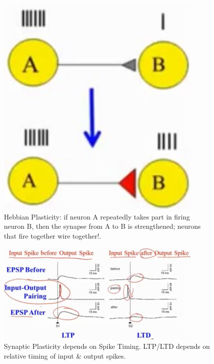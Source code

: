 \documentclass[]{article}
\begin{document}
\begin{figure}[H]
	\caption[Hebbian Plasticity]{Hebbian Plasticity: if neuron A repeatedly takes part in firing neuron B, then the synapse from A to B is strengthened; neurons that fire together wire together!.}\label{fig:hebbian-plasticity}
	\includegraphics[width=0.9\textwidth]{hebbian-plasticity}
\end{figure}

\begin{figure}[H]
	\caption[Synaptic Plasticity depends on Spike Timing]{Synaptic Plasticity depends on Spike Timing. LTP/LTD depends on relative timing of input \& output spikes.}
	\includegraphics[width=0.9\textwidth]{ltp-ltd}
\end{figure}
\end{document}

